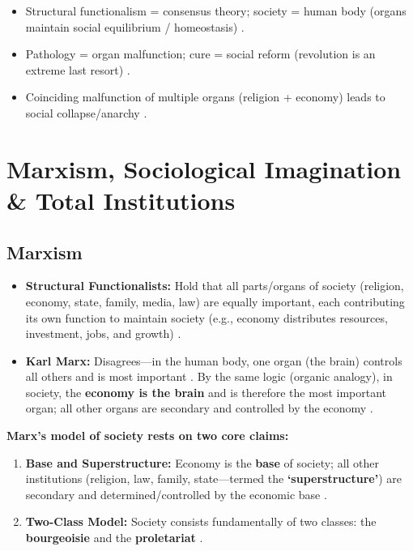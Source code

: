 \begin{QuickRevision}
\begin{itemize}
    \item Structural functionalism = consensus theory; society = human body (organs maintain social equilibrium / homeostasis) .
    \item Pathology = organ malfunction; cure = social reform (revolution is an extreme last resort) .
    \item Coinciding malfunction of multiple organs (religion + economy) leads to social collapse/anarchy .
\end{itemize}
\end{QuickRevision}

\sectiondivider

\section{Marxism, Sociological Imagination \& Total Institutions}

\subsection{Marxism}

\begin{ComparisonBox}
\begin{itemize}
    \item \textbf{Structural Functionalists:} Hold that all parts/organs of society (religion, economy, state, family, media, law) are equally important, each contributing its own function to maintain society (e.g., economy distributes resources, investment, jobs, and growth) .
    \item \textbf{Karl Marx:} Disagrees---in the human body, one organ (the brain) controls all others and is most important . By the same logic (organic analogy), in society, the \textbf{economy is the brain} and is therefore the most important organ; all other organs are secondary and controlled by the economy .
\end{itemize}
\end{ComparisonBox}

\begin{KeyConcept}
\textbf{Marx's model of society rests on two core claims:}
\begin{enumerate}
    \item \textbf{Base and Superstructure:} Economy is the \textbf{base} of society; all other institutions (religion, law, family, state---termed the \textbf{`superstructure'}) are secondary and determined/controlled by the economic base .
    \item \textbf{Two-Class Model:} Society consists fundamentally of two classes: the \textbf{bourgeoisie} and the \textbf{proletariat} .
\end{enumerate}
\end{KeyConcept}

